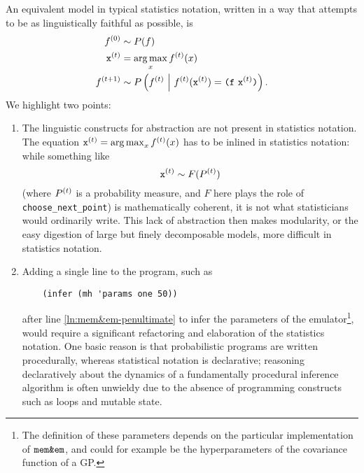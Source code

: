 An equivalent model in typical statistics notation, written in a way that
attempts to be as linguistically faithful as possible, is
\begin{align*}
  \s{0}f &\sim P(f) \\
  \s{t}\xtt &= \argmax_x \s{t}f(x) \\
  \s{t+1}f &\sim P\pn{\s{t}f \mvert \s{t}f(\s{t}\xtt) = \texttt(\ftt\ \s{t}\xtt\texttt)}.
\end{align*}
We highlight two points:
\begin{enumerate}
  \item The linguistic constructs for abstraction are not present in
    statistics notation.  The equation $\s{t}\xtt = \argmax_x \s{t}f(x)$
    has to be inlined in statistics notation: while something like
    \[ \s{t}\xtt \sim F(\s{t}P) \]
    (where $\s{t}P$ is a probability measure, and $F$ here plays the role of
    \texttt{choose\_next\_point}) is mathematically coherent, it is not what
    statisticians would ordinarily write.  This lack of abstraction then makes
    modularity, or the easy digestion of large but finely decomposable models,
    more difficult in statistics notation.

  \item Adding a single line to the program, such as
    \begin{lstlisting}
    (infer (mh 'params one 50))
    \end{lstlisting}
    after line \ref{ln:mem&em-penultimate} to infer the parameters of the
    emulator\footnote{
      The definition of these parameters depends on the particular
      implementation of $\mm$, and could for example be the hyperparameters
      of the covariance function of a GP.
    }, would require a significant refactoring and elaboration of the statistics
    notation.  One basic reason is that probabilistic programs are written
    procedurally, whereas statistical notation is declarative; reasoning
    declaratively about the dynamics of a fundamentally procedural inference
    algorithm is often unwieldy due to the absence of programming constructs
    such as loops and mutable state.
\end{enumerate}
